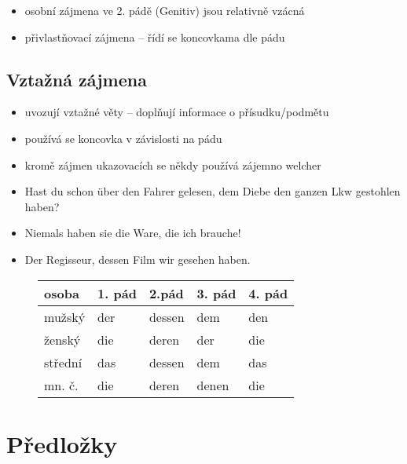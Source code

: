 \documentclass[a4paper,12pt]{report}
\begin{document}
\begin{itemize}
  \item osobní zájmena ve 2. pádě (Genitiv) jsou relativně vzácná
  \item přivlastňovací zájmena -- řídí se koncovkama dle pádu
\end{itemize}

\subsection{Vztažná zájmena}

\begin{itemize}
  \item uvozují vztažné věty -- doplňují informace o přísudku/podmětu
  \item používá se koncovka v závislosti na pádu
  \item kromě zájmen ukazovacích se někdy používá zájemno welcher
  \item Hast du schon über den Fahrer gelesen, dem Diebe den ganzen Lkw gestohlen haben?
  \item Niemals haben sie die Ware, die ich brauche!
  \item Der Regisseur, dessen Film wir gesehen haben.
\end{itemize}

\begin{figure}[h]
  \centering
  \begin{center}
    \begin{longtable}{ | m{2cm} | m{2cm} | m{2cm} | m{2cm} | m{2cm} | }
      \hline
      osoba   & 1. pád & 2.pád  & 3. pád & 4. pád \\
      \hline
      mužský  & der    & dessen & dem    & den    \\
      ženský  & die    & deren  & der    & die    \\
      střední & das    & dessen & dem    & das    \\
      mn. č.  & die    & deren  & denen  & die    \\
      \hline
    \end{longtable}
  \end{center}
\end{figure}

\section{Předložky}
\end{document}
